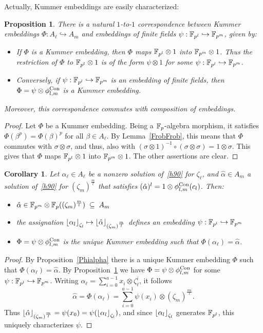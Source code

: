 \documentclass{sig-alternate}
\newtheorem{proposition}[theorem]{Proposition}
\newtheorem{corollary}[theorem]{Corollary}
\begin{document}
Actually, Kummer embeddings are easily characterized:
\begin{proposition}
\label{Phipsi}
There is a natural $1$-to-$1$ correspondence between Kummer embeddings $\Phi:A_\ell\hookrightarrow A_m$
and embeddings of finite fields $\psi:\mathbb{F}_{p^l}\hookrightarrow\mathbb{F}_{p^m}$, given by:
\begin{itemize}
\item If $\Phi$ is a Kummer embedding, then $\Phi$ maps $\mathbb{F}_{p^l}\otimes1$ into $\mathbb{F}_{p^m}\otimes 1$.
Thus the restriction of $\Phi$ to $\mathbb{F}_{p^l}\otimes1$ is of the form $\psi\otimes1$ for some $\psi:\mathbb{F}_{p^l}\hookrightarrow\mathbb{F}_{p^m}$.
\item Conversely, if $\psi:\mathbb{F}_{p^l}\hookrightarrow\mathbb{F}_{p^m}$ is an embedding of finite fields, then $\Phi=\psi\otimes{\phi^{\textrm{Con}}_{{l},{m}}}$
is a Kummer embedding.
\end{itemize}
Moreover, this correspondence commutes with composition of embeddings.
\end{proposition}
\begin{proof}
Let $\Phi$ be a Kummer embedding. Being a $\mathbb{F}_{p}$-algebra morphism, it satisfies $\Phi(\beta^p)=\Phi(\beta)^p$ for all $\beta\in A_\ell$.
By Lemma~\ref{FrobFrob}, this means that $\Phi$ commutes with $\sigma\otimes\sigma$, and thus,
also with $(\sigma\otimes 1)^{-1}\circ(\sigma\otimes\sigma)=1\otimes\sigma$.
This gives that $\Phi$ maps $\mathbb{F}_{p^l}\otimes1$ into $\mathbb{F}_{p^m}\otimes 1$.
The other assertions are clear.
\end{proof}

\begin{corollary}
\label{alphapsi}
Let $\alpha_\ell\in A_\ell$ be a nonzero solution of~\eqref{h90} for $\zeta_\ell$,
and $\hat{\alpha}\in A_m$ a solution of~\eqref{h90} for $(\zeta_m)^{\frac{m}{\ell}}$
that satisfies $(\hat{\alpha})^l=1\otimes{\phi^{\textrm{Con}}_{{l},{m}}}(c_l)$.
Then:
\begin{itemize}
\item $\hat{\alpha}\in\mathbb{F}_{p^m}\otimes\mathbb{F}_{p}((\zeta_m)^{\frac{m}{l}})\;\subseteq\;A_m$
\item the assignation $\left\lfloor \alpha_{l} \right\rfloor_{\zeta_l}\mapsto\left\lfloor \hat{\alpha} \right\rfloor_{(\zeta_m)^{\frac{m}{l}}}$
defines an embedding $\psi:\mathbb{F}_{p^l}\hookrightarrow\mathbb{F}_{p^m}$
\item $\Phi=\psi\otimes{\phi^{\textrm{Con}}_{{l},{m}}}$ is the unique Kummer embedding such that $\Phi(\alpha_\ell)=\hat{\alpha}$.
\end{itemize}
\end{corollary}
\begin{proof}
By Proposition~\ref{Phialpha} there is a unique Kummer embedding $\Phi$ such that $\Phi(\alpha_\ell)=\hat{\alpha}$.
By Proposition~\ref{Phipsi} we have $\Phi=\psi\otimes{\phi^{\textrm{Con}}_{{l},{m}}}$ for some $\psi:\mathbb{F}_{p^l}\hookrightarrow\mathbb{F}_{p^m}$.
Writing $\alpha_\ell=\sum_{i=0}^{a-1}x_i\otimes\zeta_{\ell}^i$,
it follows \[ \hat{\alpha}=\Phi(\alpha_\ell)=\sum_{i=0}^{a-1}\psi(x_i)\otimes(\zeta_m)^{\frac{mi}{\ell}}. \]
Thus $\left\lfloor \hat{\alpha} \right\rfloor_{(\zeta_m)^{\frac{m}{l}}}=\psi(x_0)=\psi(\left\lfloor \alpha_{l} \right\rfloor_{\zeta_l})$,
and since $\left\lfloor \alpha_{l} \right\rfloor_{\zeta_l}$ generates $\mathbb{F}_{p^l}$, this uniquely characterizes $\psi$.
\end{proof}
\end{document}
